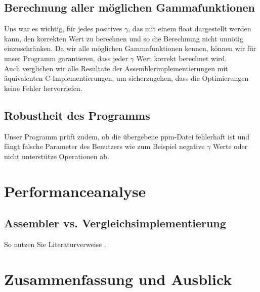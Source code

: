 \documentclass[course=erap]{aspdoc}
\begin{document}
\subsection{Berechnung aller möglichen Gammafunktionen}
Uns war es wichtig, für jedes positives $\gamma$, das mit einem float dargestellt werden kann, den korrekten Wert zu berechnen und so die Berechnung nicht unnötig einzuschränken. Da wir alle möglichen Gammafunktionen kennen, können wir für unser Programm garantieren, dass jeder $\gamma$ Wert korrekt berechnet wird. 
\\
Auch verglichen wir alle Resultate der Assemblerimplementierungen mit äquivalenten C-Implementierungen, um sicherzugehen, dass die Optimierungen keine Fehler hervorriefen.  
\subsection{Robustheit des Programms}
Unser Programm prüft zudem, ob die übergebene ppm-Datei fehlerhaft ist und fängt falsche Parameter des Benutzers wie zum Beispiel negative $\gamma$ Werte oder nicht unterstütze Operationen ab. 

\section{Performanceanalyse}
\subsection{Assembler vs. Vergleichsimplementierung}
So nutzen Sie Literaturverweise \cite{aristotle:physics}. 


\section{Zusammenfassung und Ausblick}



{}
\printbibliography
\end{document}
